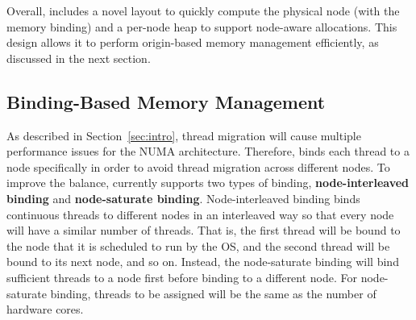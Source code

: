 

Overall, \NM{} includes a novel layout to quickly compute the physical node (with the memory binding) and a per-node heap to support node-aware allocations. This design allows it to perform origin-based memory management efficiently, as discussed in the next section. 

\subsection{Binding-Based Memory Management} 
\label{sec:balance}
As described in Section~\ref{sec:intro}, thread migration will cause multiple performance issues for the NUMA architecture. Therefore, \NM{} binds each thread to a node specifically in order to avoid thread migration across different nodes. To improve the balance, \NM{} currently supports two types of binding, \textbf{node-interleaved binding} and \textbf{node-saturate binding}. Node-interleaved binding binds continuous threads to different nodes in an interleaved way so that every node will have a similar number of threads. That is, the first thread will be bound to the node that it is scheduled to run by the OS, and the second thread will be bound to its next node, and so on. Instead, the node-saturate binding will bind sufficient threads to a node first before binding to a different node. For node-saturate binding, threads to be assigned will be the same as the number of hardware cores.  

